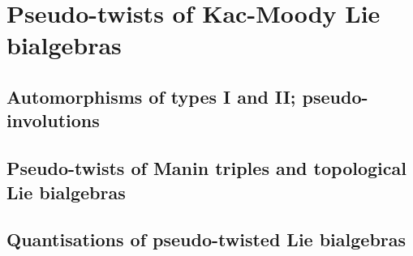 \section{Pseudo-twists of Kac-Moody Lie bialgebras}
    \subsection{Automorphisms of types I and II; pseudo-involutions}

    \subsection{Pseudo-twists of Manin triples and topological Lie bialgebras} \label{subsection: pseudo_twisted_lie_bialgebras}

    \subsection{Quantisations of pseudo-twisted Lie bialgebras} \label{subsection: pseudo_QSPs}
